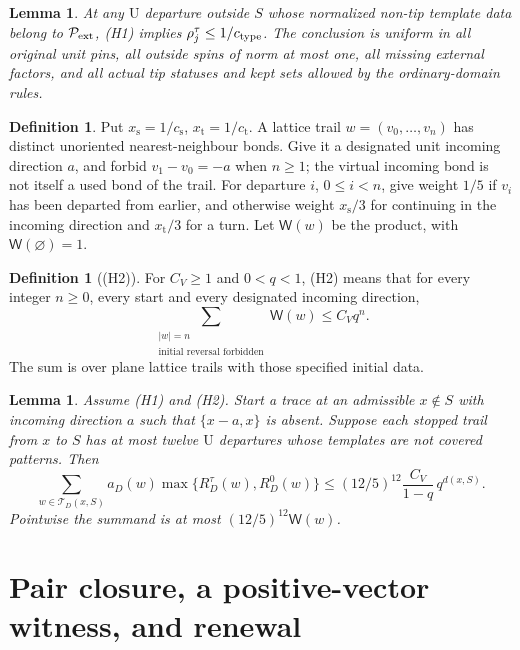 \documentclass[11pt,reqno]{amsart}
\newtheorem{lemma}[theorem]{Lemma}
\theoremstyle{definition}
\newtheorem{definition}[theorem]{Definition}
\theoremstyle{remark}
\begin{document}
\begin{lemma}\label{l:local}
At any \(\mathrm U\) departure outside \(S\) whose normalized
non-tip template data belong to \(\mathcal P_{\rm ext}\), (H1)
implies \(\rho_j^\tau\le1/c_{\rm type}\).
The conclusion is uniform in all original unit pins, all outside
spins of norm at most one, all missing external factors, and all
actual tip statuses and kept sets allowed by the ordinary-domain rules.
\end{lemma}

\begin{definition}\label{d:weights}
Put \(x_{\mathrm s}=1/c_{\mathrm s}\), \(x_{\mathrm t}=1/c_{\mathrm t}\).
A lattice trail \(w=(v_0,\ldots,v_n)\) has distinct unoriented
nearest-neighbour bonds. Give it a designated unit incoming direction
\(a\), and forbid \(v_1-v_0=-a\) when \(n\ge1\); the virtual
incoming bond is not itself a used bond of the trail.
For departure \(i\), \(0\le i<n\), give weight \(1/5\) if \(v_i\)
has been departed from earlier, and otherwise weight \(x_{\mathrm s}/3\)
for continuing in the incoming direction and \(x_{\mathrm t}/3\)
for a turn. Let \(\mathsf W(w)\) be the product, with
\(\mathsf W(\varnothing)=1\).
\end{definition}

\begin{definition}[(H2)]\label{h:H2}
For \(C_V\ge1\) and \(0<q<1\), (H2) means that for every
integer \(n\ge0\), every start and every designated incoming direction,
\[
 \sum_{\substack{|w|=n\\\text{initial reversal forbidden}}}
                      \mathsf W(w)\le C_Vq^n .
\]
The sum is over plane lattice trails with those specified initial data.
\end{definition}

\begin{lemma}\label{l:onepoint}
Assume (H1) and (H2). Start a trace at an admissible \(x\notin S\)
with incoming direction \(a\) such that \(\{x-a,x\}\) is absent.
Suppose each stopped trail from \(x\) to \(S\) has at most twelve
\(\mathrm U\) departures whose templates are not covered patterns.
Then
\[
 \sum_{w\in\mathcal T_D(x,S)}a_D(w)
                  \max\{R_D^\tau(w),R_D^0(w)\}
 \le (12/5)^{12}\frac{C_V}{1-q}\,q^{d(x,S)}.
\]
Pointwise the summand is at most \((12/5)^{12}\mathsf W(w)\).
\end{lemma}


\section{Pair closure, a positive-vector witness, and renewal}
\end{document}
